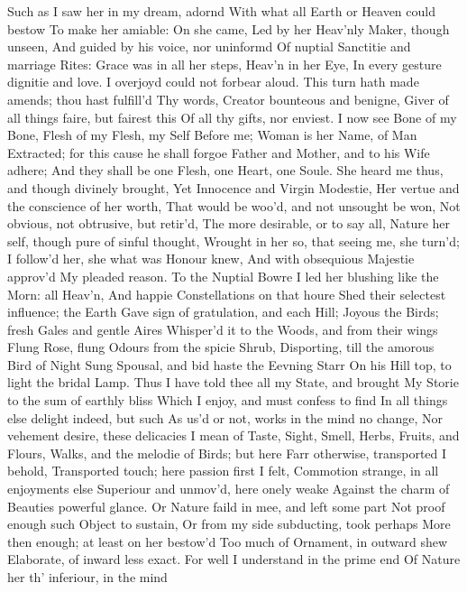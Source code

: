 \documentclass[11pt]{book}
\newcounter {first}
\begin{document}
Such as I saw her in my dream, adornd 
With what all Earth or Heaven could bestow 
To make her amiable: On she came, 
Led by her Heav'nly Maker, though unseen, 
And guided by his voice, nor uninformd 
Of nuptial Sanctitie and marriage Rites: 
Grace was in all her steps, Heav'n in her Eye, 
In every gesture dignitie and love. 
I overjoyd could not forbear aloud. 
\quad This turn hath made amends; thou hast fulfill'd 
Thy words, Creator bounteous and benigne, 
Giver of all things faire, but fairest this 
Of all thy gifts, nor enviest.  I now see 
Bone of my Bone, Flesh of my Flesh, my Self 
Before me; Woman is her Name, of Man 
Extracted; for this cause he shall forgoe 
Father and Mother, and to his Wife adhere; 
And they shall be one Flesh, one Heart, one Soule. 
\quad She heard me thus, and though divinely brought, 
Yet Innocence and Virgin Modestie, 
Her vertue and the conscience of her worth, 
That would be woo'd, and not unsought be won, 
Not obvious, not obtrusive, but retir'd, 
The more desirable, or to say all, 
Nature her self, though pure of sinful thought, 
Wrought in her so, that seeing me, she turn'd; 
I follow'd her, she what was Honour knew, 
And with obsequious Majestie approv'd 
My pleaded reason.  To the Nuptial Bowre 
I led her blushing like the Morn: all Heav'n, 
And happie Constellations on that houre 
Shed their selectest influence; the Earth 
Gave sign of gratulation, and each Hill; 
Joyous the Birds; fresh Gales and gentle Aires 
Whisper'd it to the Woods, and from their wings 
Flung Rose, flung Odours from the spicie Shrub, 
Disporting, till the amorous Bird of Night 
Sung Spousal, and bid haste the Eevning Starr 
On his Hill top, to light the bridal Lamp. 
Thus I have told thee all my State, and brought 
My Storie to the sum of earthly bliss 
Which I enjoy, and must confess to find 
In all things else delight indeed, but such 
As us'd or not, works in the mind no change, 
Nor vehement desire, these delicacies 
I mean of Taste, Sight, Smell, Herbs, Fruits, and Flours, 
Walks, and the melodie of Birds; but here 
Farr otherwise, transported I behold, 
Transported touch; here passion first I felt, 
Commotion strange, in all enjoyments else 
Superiour and unmov'd, here onely weake 
Against the charm of Beauties powerful glance. 
Or Nature faild in mee, and left some part 
Not proof enough such Object to sustain, 
Or from my side subducting, took perhaps 
More then enough; at least on her bestow'd 
Too much of Ornament, in outward shew 
Elaborate, of inward less exact. 
For well I understand in the prime end 
Of Nature her th' inferiour, in the mind 
\end{document}
